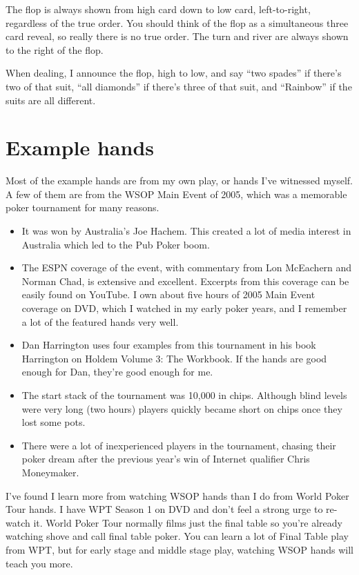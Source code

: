 The flop is always shown from high card down to low card, left-to-right,
regardless of the true order. You should think of the flop as a
simultaneous three card reveal, so really there is no true order. The turn
and river are always shown to the right of the flop.

When dealing, I announce the flop, high to low, and say ``two spades''
if there's two of that suit, ``all diamonds'' if there's three of that
suit, and ``Rainbow'' if the suits are all different.


\section*{Example hands}

Most of the example hands are from my own play, or hands I've
witnessed myself. A few of them are from the WSOP Main Event
of 2005, which was a memorable poker tournament for many reasons.

\begin{itemize}
  \item It was won by Australia's Joe Hachem. This created a lot of
    media interest in Australia which led to the Pub Poker boom.
  \item The ESPN coverage of the event, with commentary from
    Lon McEachern and Norman Chad, is extensive and
    excellent. Excerpts from this coverage can be easily found on
    YouTube. I own about five hours of 2005 Main Event coverage on
    DVD, which I watched in my early poker years, and I remember a lot
    of the featured hands very well.
  \item Dan Harrington uses four examples from this tournament in his
    book Harrington on Holdem Volume 3: The Workbook. If the hands are
    good enough for Dan, they're good enough for me.
  \item The start stack of the tournament was 10,000 in
    chips. Although blind levels were very long (two hours)
    players quickly became short on chips once they lost some pots.
  \item There were a lot of inexperienced players in the tournament,
    chasing their poker dream after the previous year's win of
    Internet qualifier Chris Moneymaker.
\end{itemize}

I've found I learn more from watching WSOP hands than I do
from World Poker Tour hands. I have WPT Season 1 on DVD and don't feel
a strong urge to re-watch it. World Poker Tour normally films just the
final table so you're already watching shove and call final table
poker. You can learn a lot of Final Table play from WPT, but for early
stage and middle stage play, watching WSOP hands will teach you more.
